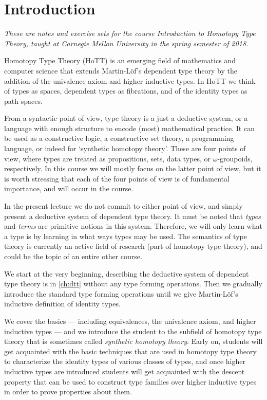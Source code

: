 \chapter{Introduction}

\emph{These are notes and exercise sets for the course Introduction to Homotopy Type Theory, taught at Carnegie Mellon University in the spring semester of 2018.} 

\bigskip
\noindent Homotopy Type Theory (HoTT) is an emerging field of mathematics and computer science that extends Martin-Löf's dependent type theory by the addition of the univalence axiom and higher inductive types. In HoTT we think of types as spaces, dependent types as fibrations, and of the identity types as path spaces.

\begin{figure}

\end{figure}

From a syntactic point of view, type theory is a just a deductive system, or a language with enough structure to encode (most) mathematical practice. It can be used as a constructive logic, a constructive set theory, a programming language, or indeed for `synthetic homotopy theory'. These are four points of view, where types are treated as propositions, sets, data types, or $\omega$-groupoids, respectively. In this course we will mostly focus on the latter point of view, but it is worth stressing that each of the four points of view is of fundamental importance, and will occur in the course.

In the present lecture we do not commit to either point of view, and simply present a deductive system of dependent type theory. It must be noted that \emph{types} and \emph{terms} are primitive notions in this system. Therefore, we will only learn what a type is by learning in what ways types may be used. The semantics of type theory is currently an active field of research (part of homotopy type theory), and could be the topic of an entire other course.

We start at the very beginning, describing the deductive system of dependent type theory is in \autoref{ch:dtt} without any type forming operations. Then we gradually introduce the standard type forming operations until we give Martin-L\"of's inductive definition of identity types. 

We cover the basics --- including equivalences, the univalence axiom, and higher inductive types --- and we introduce the student to the subfield of homotopy type theory that is sometimes called \emph{synthetic homotopy theory}. Early on, students will get acquainted with the basic techniques that are used in homotopy type theory to characterize the identity types of various classes of types, and once higher inductive types are introduced students will get acquainted with the descent property that can be used to construct type families over higher inductive types in order to prove properties about them.
